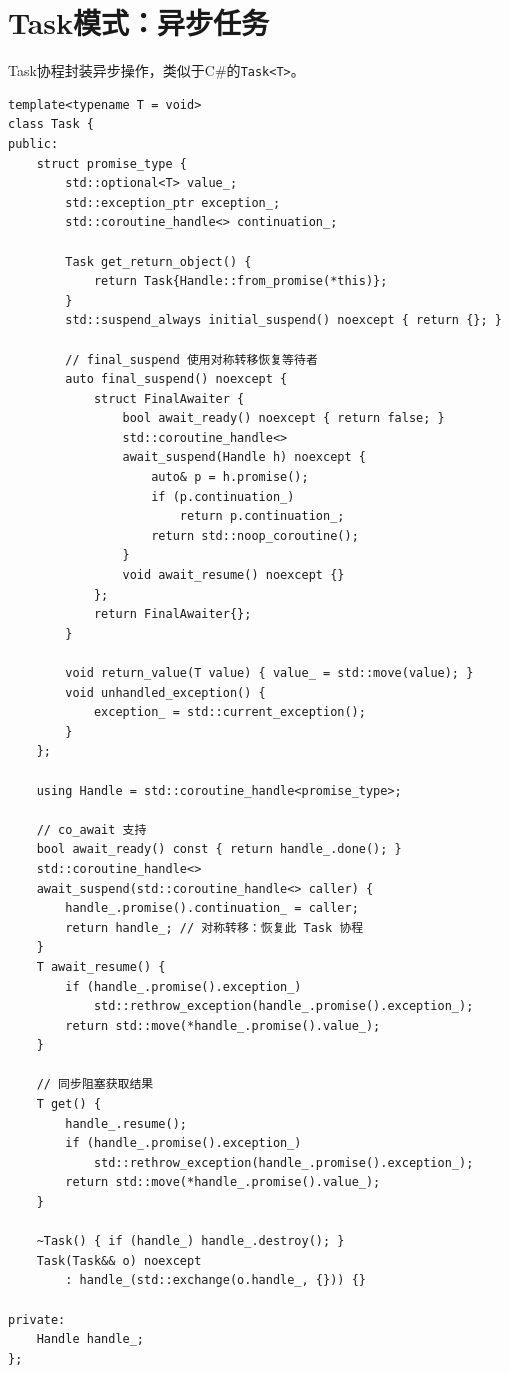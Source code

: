 \documentclass[12pt,a4paper,fontset=fandol]{ctexbook}
\newcommand{\csharp}{C\#}
\begin{document}
\section{Task模式：异步任务}

Task协程封装异步操作，类似于\csharp{}的\texttt{Task<T>}。

\begin{lstlisting}
template<typename T = void>
class Task {
public:
    struct promise_type {
        std::optional<T> value_;
        std::exception_ptr exception_;
        std::coroutine_handle<> continuation_;

        Task get_return_object() {
            return Task{Handle::from_promise(*this)};
        }
        std::suspend_always initial_suspend() noexcept { return {}; }

        // final_suspend 使用对称转移恢复等待者
        auto final_suspend() noexcept {
            struct FinalAwaiter {
                bool await_ready() noexcept { return false; }
                std::coroutine_handle<>
                await_suspend(Handle h) noexcept {
                    auto& p = h.promise();
                    if (p.continuation_)
                        return p.continuation_;
                    return std::noop_coroutine();
                }
                void await_resume() noexcept {}
            };
            return FinalAwaiter{};
        }

        void return_value(T value) { value_ = std::move(value); }
        void unhandled_exception() {
            exception_ = std::current_exception();
        }
    };

    using Handle = std::coroutine_handle<promise_type>;

    // co_await 支持
    bool await_ready() const { return handle_.done(); }
    std::coroutine_handle<>
    await_suspend(std::coroutine_handle<> caller) {
        handle_.promise().continuation_ = caller;
        return handle_; // 对称转移：恢复此 Task 协程
    }
    T await_resume() {
        if (handle_.promise().exception_)
            std::rethrow_exception(handle_.promise().exception_);
        return std::move(*handle_.promise().value_);
    }

    // 同步阻塞获取结果
    T get() {
        handle_.resume();
        if (handle_.promise().exception_)
            std::rethrow_exception(handle_.promise().exception_);
        return std::move(*handle_.promise().value_);
    }

    ~Task() { if (handle_) handle_.destroy(); }
    Task(Task&& o) noexcept
        : handle_(std::exchange(o.handle_, {})) {}

private:
    Handle handle_;
};
\end{lstlisting}
\end{document}
